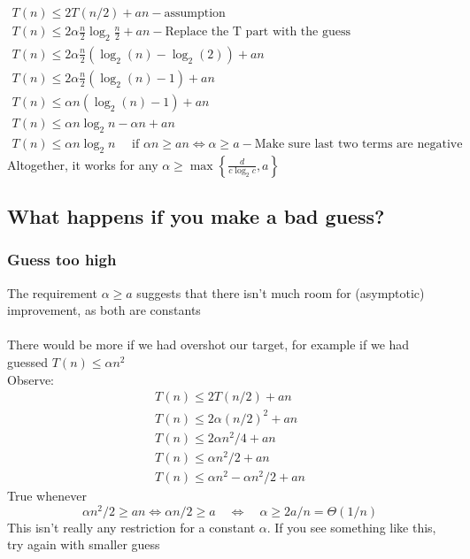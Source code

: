 \documentclass{article}[18pt]
\begin{document}
$$\begin{array} { l } { T ( n ) \leq 2 T ( n / 2 ) + a n } - \text{assumption} \\ { T ( n ) \leq 2 \alpha \frac { n } { 2 } \log _ { 2 } \frac { n } { 2 } + a n }  - \text{Replace the T part with the guess}\\ { T ( n ) \leq 2 \alpha \frac { n } { 2 } \left( \log _ { 2 } ( n ) - \log _ { 2 } ( 2 ) \right) + a n } \\ { T ( n ) \leq 2 \alpha \frac { n } { 2 } \left( \log _ { 2 } ( n ) - 1 \right) + a n } \\ { T ( n ) \leq \alpha n \left( \log _ { 2 } ( n ) - 1 \right) + a n } \\ { T ( n ) \leq \alpha n \log _ { 2 } n - \alpha n + a n } \\ { T ( n ) \leq \alpha n \log _ { 2 } n \quad \text { if } \alpha n \geq a n \Leftrightarrow \alpha \geq a } - \text{Make sure last two terms are negative} \end{array}$$
Altogether, it works for any $\alpha \geq \max \left\{ \frac { d } { c \log _ { 2 } c } , a \right\} $
\subsection{What happens if you make a bad guess?}
\subsubsection{Guess too high}
The requirement $\alpha\geqslant a$ suggests that there isn't much room for (asymptotic) improvement, as both are constants\\
\\
There would be more if we had overshot our target, for example if we had guessed $T(n)\leqslant \alpha n^2$\\
Observe:
$$\begin{array} { l } { T ( n ) \leq 2 T ( n / 2 ) + a n } \\ { T ( n ) \leq 2 \alpha ( n / 2 ) ^ { 2 } + a n } \\ { T ( n ) \leq 2 \alpha n ^ { 2 } / 4 + a n } \\ { T ( n ) \leq \alpha n ^ { 2 } / 2 + a n } \\ { T ( n ) \leq \alpha n ^ { 2 } - \alpha n ^ { 2 } / 2 + a n } \end{array}$$
True whenever
$$\alpha n ^ { 2 } / 2 \geq a n \Leftrightarrow \alpha n / 2 \geq a \quad \Leftrightarrow \quad \alpha \geq 2 a / n = \Theta ( 1 / n )$$
This isn't really any restriction for a constant $\alpha$. If you see something like this, try again with smaller guess
\end{document}
